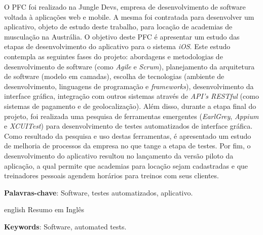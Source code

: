

\setlength{\absparsep}{18pt} %
\begin{resumo}

O PFC foi realizado na Jungle Devs, empresa de desenvolvimento de software voltada à aplicações web e mobile. A mesma foi contratada para desenvolver um aplicativo, objeto de estudo deste trabalho, para locação de academias de musculação na Austrália. O objetivo deste PFC é apresentar um estudo das etapas de desenvolvimento do aplicativo para o sistema \textit{iOS}. Este estudo contempla as seguintes fases do projeto: abordagens e metodologias de desenvolvimento de software (como \textit{Agile} e \textit{Scrum}), planejamento da arquitetura de software (modelo em camadas), escolha de tecnologias (ambiente de desenvolvimento, linguagens de programação e \textit{frameworks}), desenvolvimento da interface gráfica, integração com outros sistemas através de \textit{API's RESTful} (como sistemas de pagamento e de geolocalização). Além disso, durante a etapa final do projeto, foi realizada uma pesquisa de ferramentas emergentes (\textit{EarlGrey}, \textit{Appium} e \textit{XCUITest}) para desenvolvimento de testes automatizados de interface gráfica. Como resultado da pesquisa e uso destas ferramentas, é apresentado um estudo de melhoria de processos da empresa no que tange a etapa de testes. Por fim, o desenvolvimento do aplicativo resultou no lançamento da versão piloto da aplicação, a qual permite que academias para locação sejam cadastradas e que treinadores pessoais agendem horários para treinos com seus clientes.

 \textbf{Palavras-chave}: Software, testes automatizados, aplicativo.
\end{resumo}


\begin{resumo}[Abstract]
 \begin{otherlanguage*}{english}
Resumo em Inglês
   \vspace{\onelineskip}
 
   \noindent 
   \textbf{Keywords}: Software, automated tests.
 \end{otherlanguage*}
\end{resumo}

